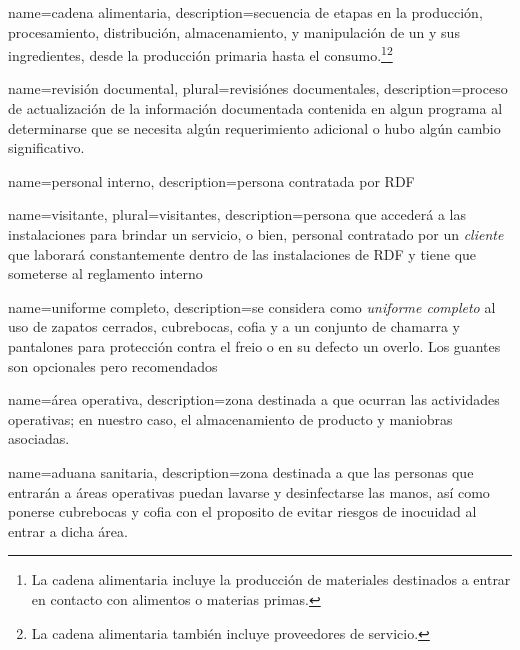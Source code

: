 


{
    name=cadena alimentaria,
    description={secuencia de etapas en la producción, procesamiento, distribución, almacenamiento, y manipulación de un  y sus ingredientes, desde la producción primaria hasta el consumo.\footnote{La cadena alimentaria incluye la producción de materiales destinados a entrar en contacto con alimentos o materias primas.}\footnote{La cadena alimentaria también incluye proveedores de servicio.}}
}


{
    name=revisión documental,
    plural=revisiónes documentales,
    description={proceso de actualización de la información documentada contenida en algun programa al determinarse que se necesita algún requerimiento adicional o hubo algún cambio significativo.}
}

{
    name=personal interno,
    description={persona contratada por RDF}
}

{
    name=visitante,
    plural=visitantes,
    description={persona que accederá a las instalaciones para brindar un servicio, o bien, personal contratado por un \emph{cliente} que laborará constantemente dentro de las instalaciones de RDF y tiene que someterse al reglamento interno}
}

{
    name=uniforme completo,
    description={se considera como \textit{uniforme completo} al uso de zapatos cerrados, cubrebocas, cofia y a un conjunto de chamarra y pantalones para protección contra el freio o en su defecto un overlo. Los guantes son opcionales pero recomendados}
}

{
    name=área operativa,
    description={zona destinada a que ocurran las actividades operativas; en nuestro caso, el almacenamiento de producto y maniobras asociadas.}
}

{
    name=aduana sanitaria,
    description={zona destinada a que las personas que entrarán a áreas operativas puedan lavarse y desinfectarse las manos, así como ponerse cubrebocas y cofia con el proposito de evitar riesgos de inocuidad al entrar a dicha área.}
}

